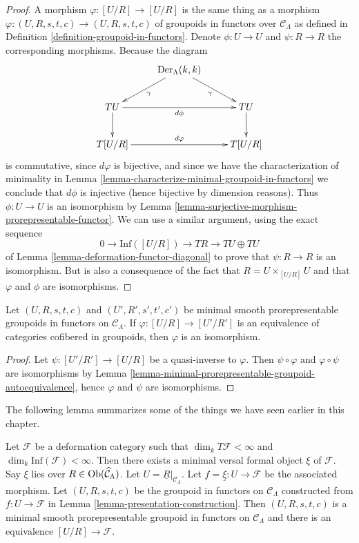 \begin{proof}
A morphism $\varphi : [U/R] \to [U/R]$ is the same thing as a
morphism $\varphi : (U, R, s, t, c) \to (U, R, s, t, c)$ of
groupoids in functors over $\mathcal{C}_\Lambda$ as defined in
Definition \ref{definition-groupoid-in-functors}.
Denote $\phi : U \to U$ and $\psi : R \to R$ the corresponding morphisms.
Because the diagram
$$
\xymatrix{
& \text{Der}_\Lambda(k, k) \ar[dr]_\gamma \ar[dl]^\gamma \\
TU \ar[rr]_{d\phi} \ar[d] & & TU \ar[d]  \\
T[U/R] \ar[rr]^{d\varphi} & & T[U/R]
}
$$
is commutative, since $d\varphi$ is bijective, and since we have
the characterization of minimality in
Lemma \ref{lemma-characterize-minimal-groupoid-in-functors}
we conclude that $d\phi$ is injective (hence bijective by dimension reasons).
Thus $\phi : U \to U$ is an isomorphism by
Lemma \ref{lemma-surjective-morphism-prorepresentable-functor}.
We can use a similar argument, using the exact sequence
$$
0 \to \text{Inf}([U/R]) \to TR \to TU \oplus TU
$$
of
Lemma \ref{lemma-deformation-functor-diagonal}
to prove that $\psi : R \to R$ is an isomorphism. But is also a consequence
of the fact that $R = U \times_{[U/R]} U$ and that $\varphi$ and $\phi$
are isomorphisms.
\end{proof}

\begin{lemma}
\label{lemma-minimal-prorepresentable-groupoid-equivalence}
Let $(U, R, s, t, c)$ and $(U', R', s', t', c')$ be minimal smooth
prorepresentable groupoids in functors on $\mathcal{C}_\Lambda$. If
$\varphi : [U/R] \to [U'/R']$ is an equivalence of categories cofibered
in groupoids, then $\varphi$ is an isomorphism.
\end{lemma}

\begin{proof}
Let $\psi : [U'/R'] \to [U/R]$ be a quasi-inverse to $\varphi$.
Then $\psi \circ \varphi$ and $\varphi \circ \psi$ are isomorphisms by
Lemma \ref{lemma-minimal-prorepresentable-groupoid-autoequivalence},
hence $\varphi$ and $\psi$ are isomorphisms.
\end{proof}

\noindent
The following lemma summarizes some of the things we have seen earlier
in this chapter.

\begin{lemma}
\label{lemma-minimal-groupoid-in-functors-construction}
Let $\mathcal{F}$ be a deformation category such that
$\dim_k T\mathcal{F} <\infty$ and
$\dim_k \text{Inf}(\mathcal{F}) < \infty$.
Then there exists a minimal versal formal object $\xi$ of $\mathcal{F}$.
Say $\xi$ lies over $R \in \mathop{\mathrm{Ob}}\nolimits(\widehat{\mathcal{C}}_\Lambda)$.
Let $U = \underline{R}|_{\mathcal{C}_\Lambda}$.
Let $f = \underline{\xi} : U \to \mathcal{F}$ be the associated
morphism. Let $(U, R, s, t, c)$ be the groupoid in functors on
$\mathcal{C}_\Lambda$ constructed from $f : U \to \mathcal{F}$ in
Lemma \ref{lemma-presentation-construction}.
Then $(U, R, s, t, c)$ is a minimal smooth prorepresentable
groupoid in functors on $\mathcal{C}_\Lambda$ and there
is an equivalence $[U/R] \to \mathcal{F}$.
\end{lemma}

